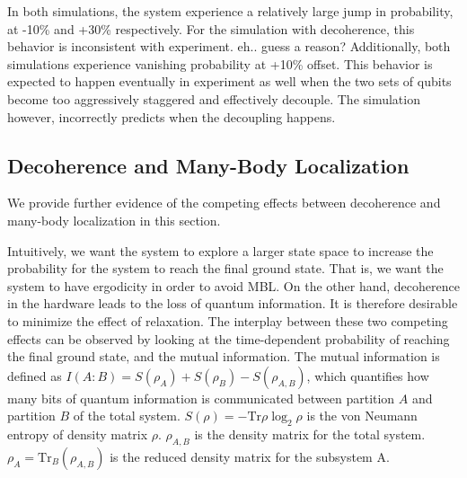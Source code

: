 \documentclass[prd,twocolumn,tightenlines,preprintnumbers,showpacs,superscriptaddress,notitlepage,nofootinbib,eqsecnum,floatfix,longbibliography]{revtex4}
\begin{document}
In both simulations, the system experience a relatively large jump in probability, at -10\% and +30\% respectively. For the simulation with decoherence, this behavior is inconsistent with experiment.  {\color{red} eh.. guess a reason?} Additionally, both simulations experience vanishing probability at +10\% offset. This behavior is expected to happen eventually in experiment as well when the two sets of qubits become too aggressively staggered and effectively decouple. The simulation however, incorrectly predicts when the decoupling happens.

\subsection{Decoherence and Many-Body Localization}

We provide further evidence of the competing effects between decoherence and many-body localization in this section.

Intuitively, we want the system to explore a larger state space to increase the probability for the system to reach the final ground state. That is, we want the system to have ergodicity in order to avoid MBL. On the other hand, decoherence in the hardware leads to the loss of quantum information. It is therefore desirable to minimize the effect of relaxation. The interplay between these two competing effects can be observed by looking at the time-dependent probability of reaching the final ground state, and the mutual information. The mutual information is defined as $I(A:B)=S(\rho_A)+S(\rho_B)-S(\rho_{A,B})$, which quantifies how many bits of quantum information is communicated between partition $A$ and partition $B$ of the total system. $S(\rho)=-\mbox{Tr}\rho \log_2 \rho$ is the von Neumann entropy of density matrix $\rho$. {\color{blue} $\rho_{A,B}$ is the density matrix for the total system. $\rho_{A}=\mbox{Tr}_{B} (\rho_{A,B})$ is the reduced density matrix for the subsystem A.}
\end{document}
